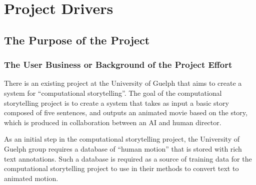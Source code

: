 \documentclass{scrreprt}
\begin{document}
\newcommand{\requirement}[9]{%
\fbox{\parbox{\textwidth}{%
\parbox[t]{.333\textwidth}{\raggedright%
\textbf{Req. \#}: \refstepcounter{RequirementNumber} \arabic{RequirementNumber} \label{#1}}%
\parbox[t]{.333\textwidth}{\centering%
\textbf{Req. Type}: #2}%
\parbox[t]{.333\textwidth}{\raggedleft%
\textbf{Use Case \#}: \ref{#3}}
\newline\\
\textbf{Description}: #4\\\\
\textbf{Rationale}: #5\\\\
\textbf{Originator}: #6\\\\
\textbf{Fit Criterion}: #7\\\\
\textbf{Priority}: #8 \hfill \textbf{History}: #9\\\\
}}}

\chapter{Project Drivers}

\section{The Purpose of the Project}

\subsection{The User Business or Background of the Project Effort}

There is an existing project at the University of Guelph that aims to create a
system for ``computational storytelling''. The goal of the computational
storytelling project is to create a system that takes as input a basic story
composed of five sentences, and outputs an animated movie based on the story,
which is produced in collaboration between an AI and human director.

As an initial step in the computational storytelling project, the University of
Guelph group requires a database of ``human motion'' that is stored with rich
text annotations. Such a database is required as a source of training data for
the computational storytelling project to use in their methods to convert text
to animated motion.
\end{document}

